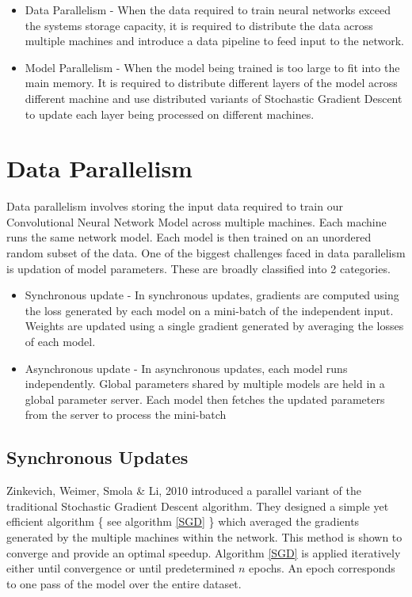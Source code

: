 \documentclass[sigconf]{acmart}
\begin{document}
\begin{itemize}
\setlength\itemsep{1em}
\item Data Parallelism - When the data required to train neural networks exceed the systems storage capacity, it is required to distribute the data across multiple machines and introduce a data pipeline to feed input to the network\cite{Dean}.
\item Model Parallelism - When the model being trained is too large to fit into the main memory. It is required to distribute different layers of the model across different machine and use distributed variants of Stochastic Gradient Descent to update each layer being processed on different machines\cite{Googlenet}.  
\end{itemize}

\section{Data Parallelism} \label{data}

Data parallelism involves storing the input data required to train our Convolutional Neural Network Model across multiple machines. Each machine runs the same network model. Each model is then trained on an unordered random subset of the data. One of the biggest challenges faced in data parallelism is updation of model parameters. These are broadly classified into 2 categories.

\begin{itemize}
\setlength\itemsep{1em}
\item Synchronous update - In synchronous updates, gradients are computed using the loss generated by each model on a mini-batch of the independent input. Weights are updated using a single gradient generated by averaging the losses of each model.

\item Asynchronous update - In asynchronous updates, each model runs independently. Global parameters shared by multiple models are held in a global parameter server. Each model then fetches the updated parameters from the server to process the mini-batch
\end{itemize}


\subsection{Synchronous Updates}

Zinkevich, Weimer,  Smola \& Li, 2010 \cite{NIPS2010-4006} introduced a parallel variant of the traditional Stochastic Gradient Descent algorithm.  They designed a simple yet efficient algorithm \{ see algorithm \ref{SGD} \} which averaged the gradients generated by the multiple machines within the network. This method is shown to converge and provide an optimal speedup. Algorithm \ref{SGD} is applied iteratively either until convergence or until predetermined $n$ epochs. An epoch corresponds to one pass of the model over the entire dataset.
\end{document}
